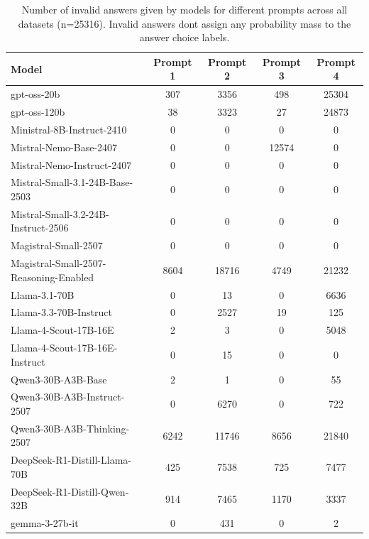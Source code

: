 \begin{table}[h]
\centering
\begin{tabular}{lcccc}
\hline
Model & Prompt 1 & Prompt 2 & Prompt 3 & Prompt 4 \\
\hline
gpt-oss-20b & 307 & 3356 & 498 & 25304 \\
gpt-oss-120b & 38 & 3323 & 27 & 24873 \\
Ministral-8B-Instruct-2410 & 0 & 0 & 0 & 0 \\
Mistral-Nemo-Base-2407 & 0 & 0 & 12574 & 0 \\
Mistral-Nemo-Instruct-2407 & 0 & 0 & 0 & 0 \\
Mistral-Small-3.1-24B-Base-2503 & 0 & 0 & 0 & 0 \\
Mistral-Small-3.2-24B-Instruct-2506 & 0 & 0 & 0 & 0 \\
Magistral-Small-2507 & 0 & 0 & 0 & 0 \\
Magistral-Small-2507-Reasoning-Enabled & 8604 & 18716 & 4749 & 21232 \\
Llama-3.1-70B & 0 & 13 & 0 & 6636 \\
Llama-3.3-70B-Instruct & 0 & 2527 & 19 & 125 \\
Llama-4-Scout-17B-16E & 2 & 3 & 0 & 5048 \\
Llama-4-Scout-17B-16E-Instruct & 0 & 15 & 0 & 0 \\
Qwen3-30B-A3B-Base & 2 & 1 & 0 & 55 \\
Qwen3-30B-A3B-Instruct-2507 & 0 & 6270 & 0 & 722 \\
Qwen3-30B-A3B-Thinking-2507 & 6242 & 11746 & 8656 & 21840 \\
DeepSeek-R1-Distill-Llama-70B & 425 & 7538 & 725 & 7477 \\
DeepSeek-R1-Distill-Qwen-32B & 914 & 7465 & 1170 & 3337 \\
gemma-3-27b-it & 0 & 431 & 0 & 2 \\
\hline
\end{tabular}
\caption{Number of invalid answers given by models for different prompts across all datasets (n=25316). Invalid answers dont assign any probability mass to the answer choice labels.}
\label{tab:invalid_answers}
\end{table}